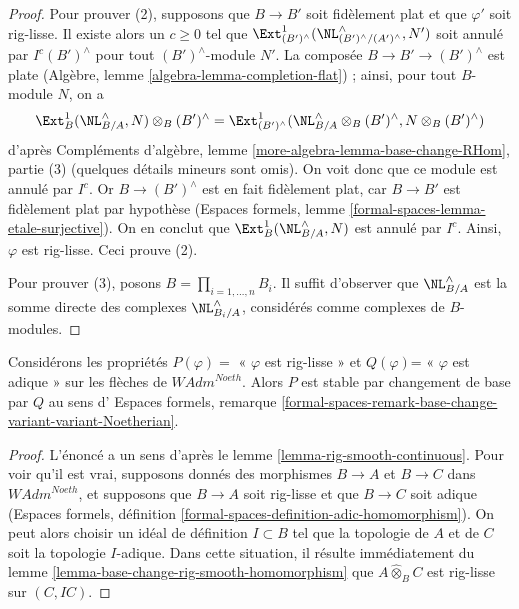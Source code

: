\begin{proof}
\medskip\noindent
Pour prouver (2), supposons que $B \to B'$ soit fidèlement plat et que $\varphi'$
soit rig-lisse. Il existe alors un $c \geq 0$ tel que
$\Ext^1_{(B')^\wedge}(\NL_{(B')^\wedge/(A')^\wedge}^\wedge, N')$
soit annulé par $I^c(B')^\wedge$ pour tout $(B')^\wedge$-module $N'$.
La composée $B \to B' \to (B')^\wedge$ est plate
(Algèbre, lemme \ref{algebra-lemma-completion-flat}) ;
ainsi, pour tout $B$-module $N$, on a
$$
\Ext^1_B(\NL_{B/A}^\wedge, N) \otimes_B (B')^\wedge =
\Ext^1_{(B')^\wedge}(\NL_{B/A}^\wedge \otimes_B (B')^\wedge,
N \otimes_B (B')^\wedge)
$$
d'après Compléments d'algèbre, lemme \ref{more-algebra-lemma-base-change-RHom}, partie (3)
(quelques détails mineurs sont omis). On voit donc que ce module est annulé
par $I^c$. Or $B \to (B')^\wedge$ est en fait fidèlement plat,
car $B \to B'$ est fidèlement plat par hypothèse (Espaces formels, lemme
\ref{formal-spaces-lemma-etale-surjective}).
On en conclut que $\Ext^1_B(\NL_{B/A}^\wedge, N)$ est annulé par $I^c$.
Ainsi, $\varphi$ est rig-lisse. Ceci prouve (2).

\medskip\noindent
Pour prouver (3), posons $B = \prod_{i = 1, \ldots, n} B_i$.
Il suffit d'observer que $\NL_{B/A}^\wedge$ est la somme
directe des complexes $\NL_{B_i/A}^\wedge$, considérés comme complexes
de $B$-modules.
\end{proof}

\begin{lemma}
\label{lemma-base-change-rig-smooth-continuous}
Considérons les propriétés $P(\varphi)=$ « $\varphi$ est rig-lisse »
et $Q(\varphi)$= « $\varphi$ est adique » sur les flèches de $\textit{WAdm}^{Noeth}$.
Alors $P$ est stable par changement de base par $Q$ au sens d'
Espaces formels, remarque
\ref{formal-spaces-remark-base-change-variant-variant-Noetherian}.
\end{lemma}

\begin{proof}
L'énoncé a un sens d'après le lemme \ref{lemma-rig-smooth-continuous}.
Pour voir qu'il est vrai, supposons donnés des morphismes
$B \to A$ et $B \to C$ dans $\textit{WAdm}^{Noeth}$,
et supposons que $B \to A$ soit rig-lisse et que $B \to C$ soit adique
(Espaces formels, définition
\ref{formal-spaces-definition-adic-homomorphism}).
On peut alors choisir un idéal de définition $I \subset B$
tel que la topologie de $A$ et de $C$ soit la topologie $I$-adique.
Dans cette situation, il résulte immédiatement du
lemme \ref{lemma-base-change-rig-smooth-homomorphism} que
$A \widehat{\otimes}_B C$ est rig-lisse sur $(C, IC)$.
\end{proof}

